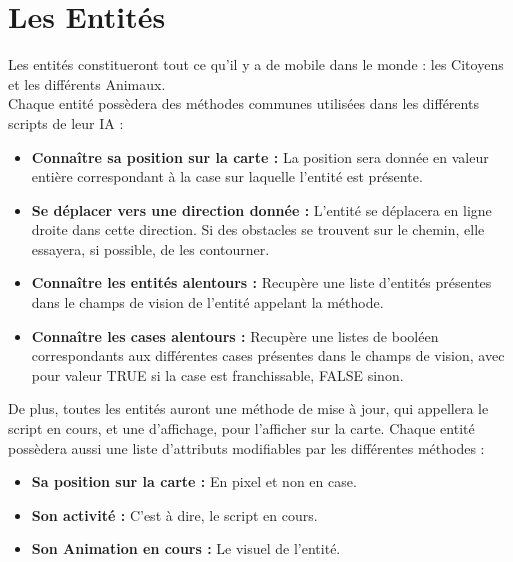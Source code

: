 \documentclass[a4paper]{article}
\newcommand{\alinea}{\hspace*{0.5cm}}
\begin{document}
    \section{Les Entités}
      \alinea Les entités constitueront tout ce qu'il y a de mobile dans le monde : les Citoyens et les différents Animaux.\\
      Chaque entité possèdera des méthodes communes utilisées dans les différents scripts de leur IA :
      \begin{itemize}
        \item \textbf{Connaître sa position sur la carte : } La position sera donnée en valeur entière correspondant à la case sur laquelle l'entité est présente.
        \item \textbf{Se déplacer vers une direction donnée : } L'entité se déplacera en ligne droite dans cette direction. Si des obstacles se trouvent sur le chemin, elle essayera, si possible, de les contourner.
        \item \textbf{Connaître les entités alentours : } Recupère une liste d'entités présentes dans le champs de vision de l'entité appelant la méthode.
        \item \textbf{Connaître les cases alentours : } Recupère une listes de booléen correspondants aux différentes cases présentes dans le champs de vision, avec pour valeur TRUE si la case est franchissable, FALSE sinon.
      \end{itemize}
      \alinea De plus, toutes les entités auront une méthode de mise à jour, qui appellera le script en cours, et une d'affichage, pour l'afficher sur la carte.
      \alinea Chaque entité possèdera aussi une liste d'attributs modifiables par les différentes méthodes : 
      \begin{itemize}
        \item \textbf{Sa position sur la carte : } En pixel et non en case.
        \item \textbf{Son activité : } C'est à dire, le script en cours.
        \item \textbf{Son Animation en cours : } Le visuel de l'entité.
      \end{itemize}
      
\end{document}
